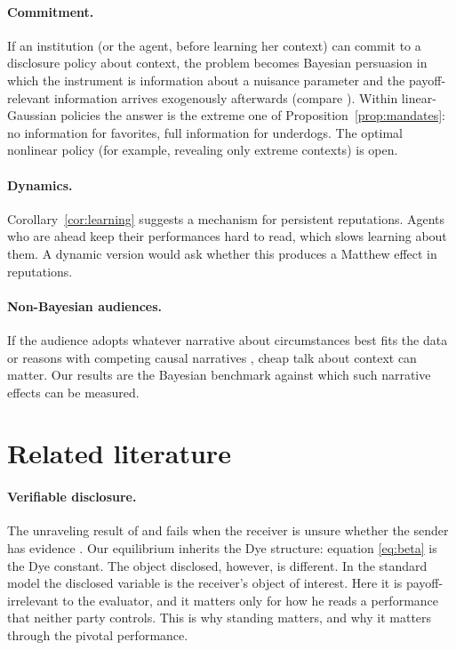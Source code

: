 \documentclass[11pt]{article}
\theoremstyle{definition}
\begin{document}
\paragraph{Commitment.} If an institution (or the agent, before learning her context) can commit to a disclosure policy about context, the problem becomes Bayesian persuasion in which the instrument is information about a nuisance parameter and the payoff-relevant information arrives exogenously afterwards (compare \citealp{BizzottoRudigerVigier2021}). Within linear-Gaussian policies the answer is the extreme one of Proposition~\ref{prop:mandates}: no information for favorites, full information for underdogs. The optimal nonlinear policy (for example, revealing only extreme contexts) is open.

\paragraph{Dynamics.} Corollary~\ref{cor:learning} suggests a mechanism for persistent reputations. Agents who are ahead keep their performances hard to read, which slows learning about them. A dynamic version would ask whether this produces a Matthew effect in reputations.

\paragraph{Non-Bayesian audiences.} If the audience adopts whatever narrative about circumstances best fits the data \citep{SchwartzsteinSunderam2021} or reasons with competing causal narratives \citep{EliazSpiegler2020}, cheap talk about context can matter. Our results are the Bayesian benchmark against which such narrative effects can be measured.

\section{Related literature}\label{sec:lit}

\paragraph{Verifiable disclosure.} The unraveling result of \citet{Grossman1981} and \citet{Milgrom1981} fails when the receiver is unsure whether the sender has evidence \citep{Dye1985,JungKwon1988,Shin1994}. Our equilibrium inherits the Dye structure: equation \eqref{eq:beta} is the Dye constant. The object disclosed, however, is different. In the standard model the disclosed variable is the receiver's object of interest. Here it is payoff-irrelevant to the evaluator, and it matters only for how he reads a performance that neither party controls. This is why standing matters, and why it matters through the pivotal performance.
\end{document}
